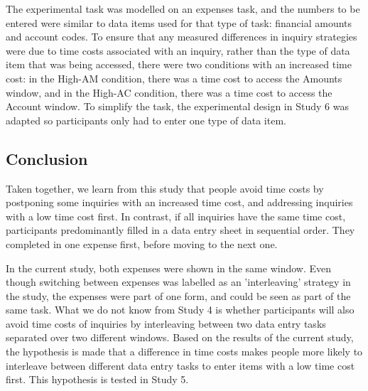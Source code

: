 The experimental task was modelled on an expenses task, and the numbers to be entered were similar to data items used for that type of task: financial amounts and account codes. To ensure that any measured differences in inquiry strategies were due to time costs associated with an inquiry, rather than the type of data item that was being accessed, there were two conditions with an increased time cost: in the High-AM condition, there was a time cost to access the Amounts window, and in the High-AC condition, there was a time cost to access the Account window. To simplify the task, the experimental design in Study 6 was adapted so participants only had to enter one type of data item. 


\subsection{Conclusion}
Taken together, we learn from this study that people avoid time costs by postponing some inquiries with an increased time cost, and addressing inquiries with a low time cost first. In contrast, if all inquiries have the same time cost, participants predominantly filled in a data entry sheet in sequential order. They completed in one expense first, before moving to the next one. 

In the current study, both expenses were shown in the same window. Even though switching between expenses was labelled as an 'interleaving' strategy in the study, the expenses were part of one form, and could be seen as part of the same task. What we do not know from Study 4 is whether participants will also avoid time costs of inquiries by interleaving between two data entry tasks separated over two different windows. Based on the results of the current study, the hypothesis is made that a difference in time costs makes people more likely to interleave between different data entry tasks to enter items with a low time cost first. This hypothesis is tested in Study 5.


